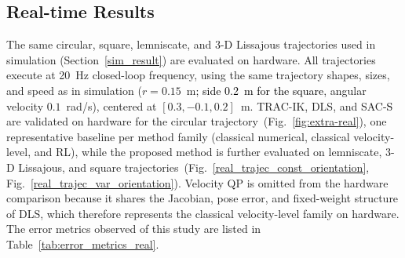 \documentclass[preprint,12pt]{elsarticle}
\begin{document}
\FloatBarrier
\subsection{Real-time Results}
\label{real_time_deployment}
The same circular, square, lemniscate, and 3-D Lissajous trajectories
used in simulation (Section~\ref{sim_result}) are evaluated on hardware. All trajectories execute at 20~Hz closed-loop frequency, using the same trajectory shapes, sizes, and speed as in simulation ($r = 0.15$~m\textcolor{black}{; side 0.2~m for the square}, angular velocity $0.1$~rad/s), centered at $[0.3, -0.1, 0.2]$~m. TRAC-IK, DLS, and SAC\textcolor{black}{-S} are validated on hardware for the circular trajectory~(Fig.~\ref{fig:extra-real}), one representative baseline per method family (classical numerical, classical velocity-level, and RL), while the proposed method is further evaluated on lemniscate, 3-D Lissajous, and square trajectories~(Fig.~\ref{real_trajec_const_orientation}, Fig.~\ref{real_trajec_var_orientation}). Velocity QP is omitted from the hardware comparison because it shares the Jacobian, pose error, and fixed-weight structure of DLS, which therefore represents the classical velocity-level family on hardware. The error metrics observed of this study are listed in Table~\ref{tab:error_metrics_real}.
\end{document}
